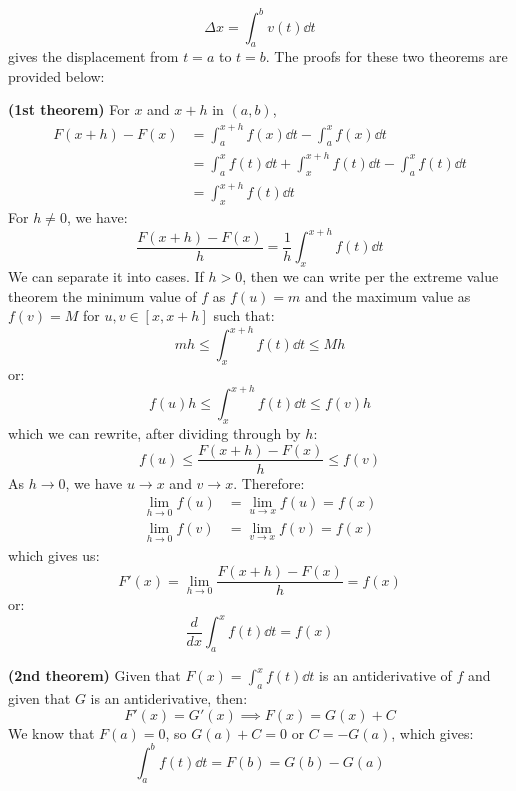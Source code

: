 \documentclass{article}
\let\oldtextbf\textbf
\renewcommand{\textbf}[1]{\oldtextbf{#1}\index{#1}}
\begin{document}
\begin{equation}
    \Delta x = \int_a^b v(t) \dd{t}
    \label{eq:}
\end{equation}
gives the displacement from $t=a$ to $t=b$. The proofs for these two theorems are provided below:
\begin{prooof}
    \textbf{(1st theorem)} For $x$ and $x+h$ in $(a,b)$,
    \begin{align}
        F(x+h)-F(x) &= \int_a^{x+h} f(x) \dd{t} - \int_a^x f(x) \dd{t} \\ 
        &= \int_a^x f(t)\dd{t} + \int_x^{x+h}f(t)\dd{t}-\int_a^x f(t)\dd{t} \\ 
        &= \int_x^{x+h} f(t) \dd{t}
    \end{align}
    For $h\neq 0$, we have:
    \begin{equation}
        \frac{F(x+h)-F(x)}{h}=\frac{1}{h}\int_x^{x+h}f(t)\dd{t}
        \label{eq:}
    \end{equation}
    We can separate it into cases. If $h>0$, then we can write per the extreme value theorem the minimum value of $f$ as $f(u)=m$ and the maximum value as $f(v)=M$ for $u,v\in[x,x+h]$ such that:
    \begin{equation}
        mh \le \int_x^{x+h} f(t)\dd{t} \le Mh
        \label{eq:}
    \end{equation}
    or:
    \begin{equation}
        f(u)h \le \int_x^{x+h}f(t)\dd{t} \le f(v)h
        \label{eq:}
    \end{equation}
    which we can rewrite, after dividing through by $h$:
    \begin{equation}
        f(u) \le \frac{F(x+h)-F(x)}{h} \le f(v)
        \label{eq:}
    \end{equation}
    As $h\to 0$, we have $u\to x$ and $v\to x$. Therefore:
    \begin{align}
        \lim_{h\to 0} f(u) &= \lim_{u\to x}f(u) = f(x) \\ 
        \lim_{h\to 0} f(v) &= \lim_{v\to x}f(v) = f(x)
        \label{eq:}
    \end{align}
    which gives us:
    \begin{equation}
        F'(x)=\lim_{h\to 0} \frac{F(x+h)-F(x)}{h} = f(x)
        \label{eq:}
    \end{equation}
    or:
    \begin{equation}
        \frac{d}{dx}\int_a^x f(t) \dd{t} = f(x)
        \label{eq:}
    \end{equation}
\end{prooof}
\begin{prooof}
    \textbf{(2nd theorem)} Given that $F(x)=\int_a^x f(t) \dd{t}$ is an antiderivative of $f$ and given that $G$ is an antiderivative, then:
    \begin{equation}
        F'(x)=G'(x) \implies F(x) = G(x)+C
        \label{eq:}
    \end{equation}
    We know that $F(a)=0$, so $G(a)+C=0$ or $C=-G(a)$, which gives:
    \begin{equation}
        \int_a^b f(t) \dd{t} = F(b) = G(b) - G(a)
        \label{eq:}
    \end{equation}
\end{prooof}
\end{document}

